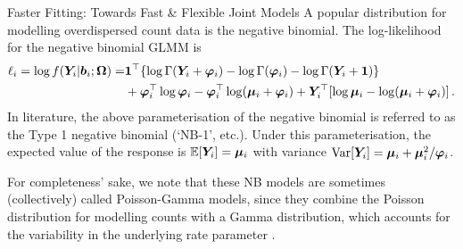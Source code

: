 \begin{chapter}{\label{cha:flexible}Faster Fitting: Towards Fast \& Flexible Joint Models}
A popular distribution for modelling overdispersed count data is the negative binomial. The log-likelihood for the negative binomial GLMM is
\begin{equation}
    \begin{aligned}
        \ell_i=\log f\lb\Y|\b;\bO\rb=&\boneT\lbr\lgam{\Y+\bphi}-\lgam{\bphi}-\lgam{\Y+\bm{1}}\rbr\\
        &+\bphi^\top\log\bphi-\bphi^\top\log\lb\bmu+\bphi\rb+\Y^\top\ls\log\bmu-\log\lb\bmu+\bphi\rb\rs.
    \end{aligned}
\label{eq:flexible-negbin-ll}
\end{equation}
In literature, the above parameterisation of the negative binomial is referred to as the Type 1 negative binomial (`NB-1', etc.\!). Under this parameterisation, the expected value of the response is $\operatorname{\mathbb{E}}\!\left[\bm{Y}_i\right]=\bm{\mu}_i$ with variance $\mathrm{Var}\!\left[\bm{Y}_i\right]=\bm{\mu}_i+\bm{\mu}_i^2/\bm{\varphi}_i$. 

For completeness' sake, we note that these NB models are sometimes (collectively) called Poisson-Gamma models, since they combine the Poisson distribution for modelling counts with a Gamma distribution, which accounts for the variability in the underlying rate parameter \citep{Ismal2007}.

\end{chapter}
